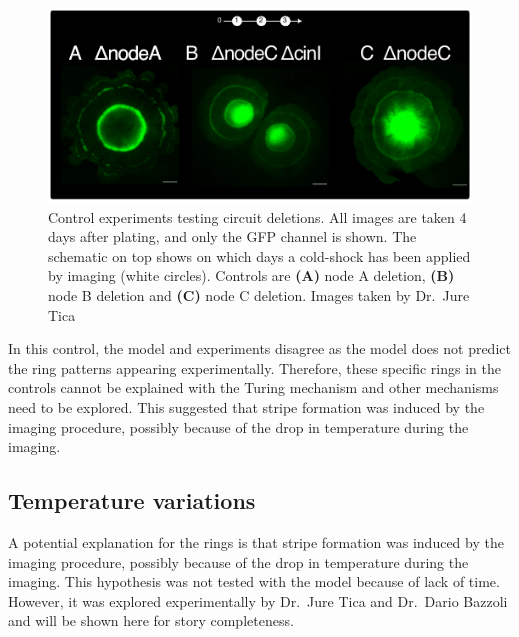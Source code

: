 \begin{figure}[H] %
    \centering
    \begin{adjustbox}{center}
        \includegraphics[width=1\textwidth]{chapters/Chapter 3/experimental_node_dele} %
    \end{adjustbox}
    \caption{Control experiments testing circuit deletions. All images are taken 4 days after plating, and only the GFP channel is shown. The schematic on top shows on which days a cold-shock has been applied by imaging (white circles). Controls are \textbf{(A)} node A deletion, \textbf{(B)} node B deletion and \textbf{(C)} node C deletion. Images taken by Dr.~Jure Tica}
    \label{fig:experimental_node_dele}
\end{figure}

In this control, the model and experiments disagree as the model does not predict the ring patterns appearing experimentally.
Therefore, these specific rings in the controls cannot be explained with the Turing mechanism and other mechanisms need to be explored.
This suggested that stripe formation was induced by the imaging procedure, possibly because of the drop in temperature during the imaging.
\subsection{Temperature variations}
A potential explanation for the rings is that stripe formation was induced by the imaging procedure, possibly because of the drop in temperature during the imaging.
This hypothesis was not tested with the model because of lack of time.
However, it was explored experimentally by Dr.~Jure Tica and Dr.~Dario Bazzoli and will be shown here for story completeness.

